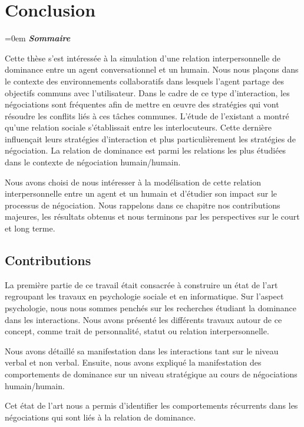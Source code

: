 \chapter{Conclusion}

\begingroup
\parindent=0em
\emph{\textbf{Sommaire}}
\localtableofcontents 
\clearpage
\endgroup

Cette thèse s'est intéressée à la simulation d'une relation interpersonnelle de dominance entre un agent conversationnel et un humain.
Nous nous plaçons dans le contexte des environnements collaboratifs dans lesquels l'agent partage des objectifs communs avec l'utilisateur. Dans le cadre de ce type d'interaction, les négociations sont fréquentes afin de mettre en œuvre des stratégies qui vont résoudre les conflits liés à ces tâches communes. 
L'étude de l'existant a montré qu'une relation sociale s'établissait entre les interlocuteurs. Cette dernière influençait leurs stratégies d'interaction et plus particulièrement les stratégies de négociation. La relation de dominance est parmi les relations les plus étudiées dans le contexte de négociation humain/humain. 

Nous avons choisi de nous intéresser à la modélisation de cette relation interpersonnelle entre un agent et un humain et d'étudier son impact sur le processus de négociation.  Nous rappelons dans ce chapitre nos contributions majeures, les résultats obtenus et nous terminons par les perspectives sur le court et long terme. 

\section{Contributions}

La première partie de ce travail était consacrée à construire un état de l'art regroupant les travaux en psychologie sociale et en informatique.  Sur l'aspect psychologie, nous nous sommes penchés sur les recherches étudiant la dominance dans les interactions. Nous avons présenté les différents travaux autour de ce concept, comme trait de personnalité, statut ou relation interpersonnelle.

Nous avons détaillé sa manifestation dans les interactions tant sur le niveau verbal et non verbal. Ensuite, nous avons expliqué la manifestation des comportements de dominance sur un niveau stratégique au cours de négociations humain/humain.

Cet état de l'art nous a permis d'identifier les comportements récurrents dans les négociations qui sont liés à la relation de dominance.


